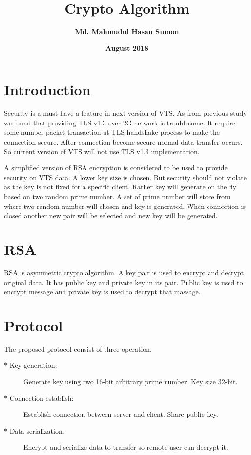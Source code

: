 \documentclass[a4paper]{article}
\title{\textbf{Crypto Algorithm}}
\author{\textbf{Md. Mahmudul Hasan Sumon} }
\date{\textbf{August 2018}}
\begin{document}
\maketitle
\newpage
\tableofcontents
\newpage
{}
\section{Introduction}
Security is a must have a feature in next version of VTS. As from previous study we found that providing TLS v1.3 over 2G network is troublesome. It require some number packet transaction at TLS handshake process to make the connection secure. After connection become secure normal data transfer occurs. So current version of VTS will not use TLS v1.3 implementation. 

A simplified version of RSA encryption is considered to be used to provide security on VTS data. A lower key size is chosen. But security should not violate as the key is not fixed for a specific client. Rather key will generate on the fly based on two random prime number. A set of prime number will store from where two random number will chosen and key is generated. When connection is closed another new pair will be selected and new key will be generated. 

\section{RSA}
RSA is asymmetric crypto algorithm. A key pair is used to encrypt and decrypt original data. It has public key and private key in its pair. Public key is used to encrypt message and private key is used to decrypt that massage. 


\section{Protocol}
The proposed protocol consist of three operation.
    \begin{description}
    \item[$\ast$ Key generation:] Generate key using two 16-bit arbitrary prime number. Key size 32-bit.
    \item[$\ast$ Connection establish:] Establish connection between server and client. Share public key.
    \item[$\ast$ Data serialization:] Encrypt and serialize data to transfer so remote user can decrypt it.
    \end{description}
    
\end{document}
